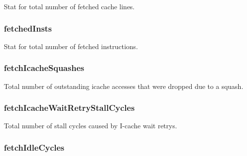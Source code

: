 \label{classDefaultFetch_a0ead660daa133edcd64ac552d473ebba}
Stat for total number of fetched cache lines. \hypertarget{classDefaultFetch_af0e3fa228032036d2022ed9e2a3612b6}{
\subsubsection[{fetchedInsts}]{ {\bf fetchedInsts}}}
\label{classDefaultFetch_af0e3fa228032036d2022ed9e2a3612b6}
Stat for total number of fetched instructions. \hypertarget{classDefaultFetch_af5ce6113f31fddaab758b8fb025600bc}{
\subsubsection[{fetchIcacheSquashes}]{ {\bf fetchIcacheSquashes}}}
\label{classDefaultFetch_af5ce6113f31fddaab758b8fb025600bc}
Total number of outstanding icache accesses that were dropped due to a squash. \hypertarget{classDefaultFetch_a85ea1666f596116bc53a277b388d39d7}{
\subsubsection[{fetchIcacheWaitRetryStallCycles}]{ {\bf fetchIcacheWaitRetryStallCycles}}}
\label{classDefaultFetch_a85ea1666f596116bc53a277b388d39d7}
Total number of stall cycles caused by I-\/cache wait retrys. \hypertarget{classDefaultFetch_a8af716ad2a53a409640347226078591c}{
\subsubsection[{fetchIdleCycles}]{ {\bf fetchIdleCycles}}}
